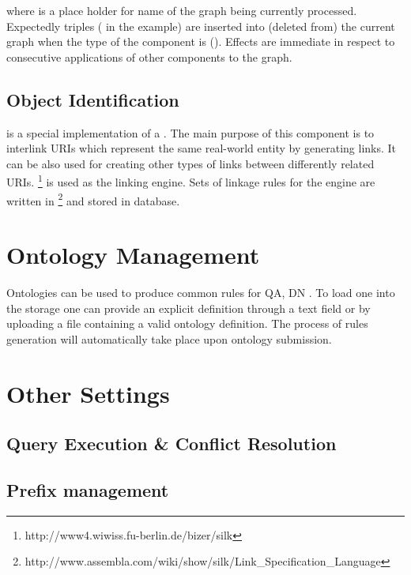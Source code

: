where  is a place holder for name of the graph being currently processed. Expectedly triples ( in the example) are inserted into (deleted from) the current graph when the type of the component is  (). Effects are immediate in respect to consecutive applications of other components to the graph.

\subsection{Object Identification}
\label{sub:objectIdentification}

 is a special implementation of a . The main purpose of this component is to interlink URIs which represent the same real-world entity by generating  links. It can be also used for creating other types of links between differently related URIs. \footnote{http://www4.wiwiss.fu-berlin.de/bizer/silk} is used as the linking engine. Sets of linkage rules for the engine are written in \footnote{http://www.assembla.com/wiki/show/silk/Link\_Specification\_Language} and stored in database.

\section{Ontology Management}
\label{sec:ontologyManagement}

Ontologies can be used to produce common rules for QA, DN . To load one into the storage one can provide an explicit definition through a text field or by uploading a file containing a valid  ontology definition. The process of rules generation will automatically take place upon ontology submission.

\section{Other Settings}

\subsection{Query Execution \& Conflict Resolution}
\label{sec:QEnCR}

\subsection{Prefix management}
\label{sec:frontendPrefixMgmt}

